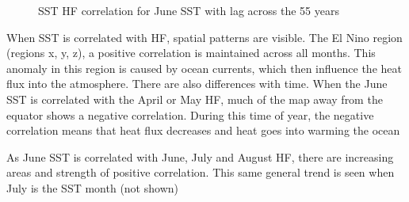 \begin{figure}
	\centering
	
	\caption{SST HF correlation for June SST with lag across the 55 years} \label{fig:corr_sstJune_hflag} 
\end{figure} 

When SST is correlated with HF, spatial patterns are visible. The El Nino region (regions x, y, z), a positive correlation is maintained across all months. This anomaly in this region is caused by ocean currents, which then influence the heat flux into the atmosphere. There are also differences with time. When the June SST is correlated with the April or May HF, much of the map away from the equator shows a negative correlation. During this time of year, the 
negative correlation means that heat flux decreases and heat goes into warming the ocean

As June SST is correlated with June, July and August HF, there are increasing areas and strength of positive correlation. This same general trend is seen when July is the SST month (not shown)

%	

